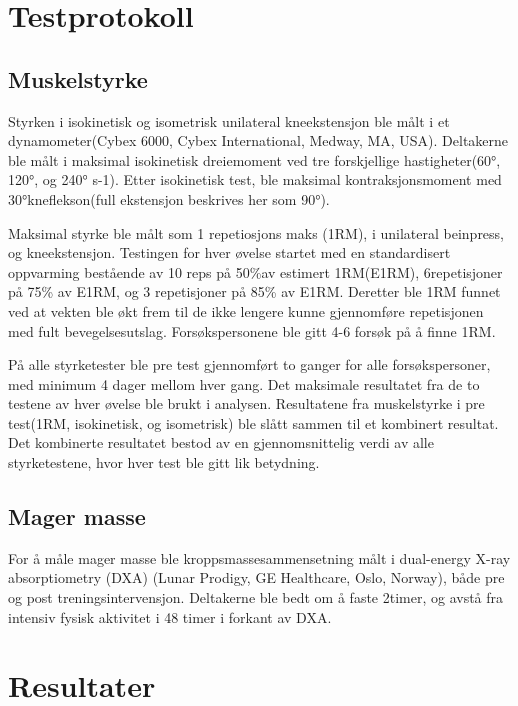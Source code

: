 \documentclass[
]{book}
\begin{document}
\hypertarget{testprotokoll}{%
\section{Testprotokoll}\label{testprotokoll}}

\hypertarget{muskelstyrke}{%
\subsection{Muskelstyrke}\label{muskelstyrke}}

Styrken i isokinetisk og isometrisk unilateral kneekstensjon ble målt i et dynamometer(Cybex 6000, Cybex International, Medway, MA, USA). Deltakerne ble målt i maksimal isokinetisk dreiemoment ved tre forskjellige hastigheter(60°, 120°, og 240° s-1). Etter isokinetisk test, ble maksimal kontraksjonsmoment med 30°kneflekson(full ekstensjon beskrives her som 90°).

Maksimal styrke ble målt som 1 repetiosjons maks (1RM), i unilateral beinpress, og kneekstensjon. Testingen for hver øvelse startet med en standardisert oppvarming bestående av 10 reps på 50\%av estimert 1RM(E1RM), 6repetisjoner på 75\% av E1RM, og 3 repetisjoner på 85\% av E1RM. Deretter ble 1RM funnet ved at vekten ble økt frem til de ikke lengere kunne gjennomføre repetisjonen med fult bevegelsesutslag. Forsøkspersonene ble gitt 4-6 forsøk på å finne 1RM.

På alle styrketester ble pre test gjennomført to ganger for alle forsøkspersoner, med minimum 4 dager mellom hver gang. Det maksimale resultatet fra de to testene av hver øvelse ble brukt i analysen. Resultatene fra muskelstyrke i pre test(1RM, isokinetisk, og isometrisk) ble slått sammen til et kombinert resultat. Det kombinerte resultatet bestod av en gjennomsnittelig verdi av alle styrketestene, hvor hver test ble gitt lik betydning.

\hypertarget{mager-masse}{%
\subsection{Mager masse}\label{mager-masse}}

For å måle mager masse ble kroppsmassesammensetning målt i dual-energy X-ray absorptiometry (DXA) (Lunar Prodigy, GE Healthcare, Oslo, Norway), både pre og post treningsintervensjon. Deltakerne ble bedt om å faste 2timer, og avstå fra intensiv fysisk aktivitet i 48 timer i forkant av DXA.

\hypertarget{resultater-2}{%
\section{Resultater}\label{resultater-2}}
\end{document}
